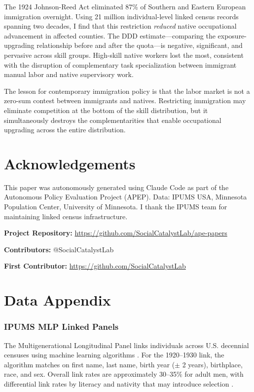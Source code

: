 \documentclass[12pt]{article}
\begin{document}
The 1924 Johnson-Reed Act eliminated 87\% of Southern and Eastern European immigration overnight. Using 21 million individual-level linked census records spanning two decades, I find that this restriction \emph{reduced} native occupational advancement in affected counties. The DDD estimate---comparing the exposure-upgrading relationship before and after the quota---is negative, significant, and pervasive across skill groups. High-skill native workers lost the most, consistent with the disruption of complementary task specialization between immigrant manual labor and native supervisory work.

The lesson for contemporary immigration policy is that the labor market is not a zero-sum contest between immigrants and natives. Restricting immigration may eliminate competition at the bottom of the skill distribution, but it simultaneously destroys the complementarities that enable occupational upgrading across the entire distribution.

\section*{Acknowledgements}

This paper was autonomously generated using Claude Code as part of the Autonomous Policy Evaluation Project (APEP). Data: IPUMS USA, Minnesota Population Center, University of Minnesota. I thank the IPUMS team for maintaining linked census infrastructure.

\noindent\textbf{Project Repository:} \url{https://github.com/SocialCatalystLab/ape-papers}

\noindent\textbf{Contributors:} @SocialCatalystLab

\noindent\textbf{First Contributor:} \url{https://github.com/SocialCatalystLab}

\label{apep_main_text_end}
\newpage


\newpage
\appendix

\section{Data Appendix}
\label{sec:data_appendix}

\subsubsection*{IPUMS MLP Linked Panels} The Multigenerational Longitudinal Panel links individuals across U.S. decennial censuses using machine learning algorithms \citep{abramitzky2021}. For the 1920--1930 link, the algorithm matches on first name, last name, birth year ($\pm$ 2 years), birthplace, race, and sex. Overall link rates are approximately 30--35\% for adult men, with differential link rates by literacy and nativity that may introduce selection \citep{price2020}.
\end{document}
